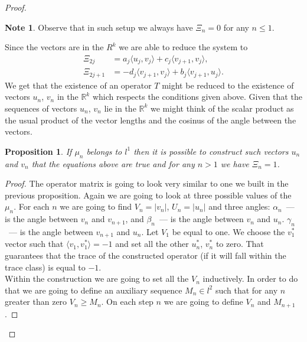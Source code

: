 \documentclass[12pt]{article}
\newcommand\inner[2]{\langle #1, #2 \rangle}
\renewcommand{\leq}{\leqslant}
\renewcommand{\geq}{\geqslant}
\newtheorem{prop}{Proposition}
\theoremstyle{definition}
\newtheorem*{note}{Note}
\numberwithin{remark}{section}
\numberwithin{theorem}{section}
\numberwithin{prop}{section}
\numberwithin{equation}{section}
\numberwithin{lemma}{section}
\numberwithin{prop_under_lemma}{lemma}
\begin{document}
\begin{proof}
\begin{note}
        Observe that in such setup we always have $\Xi_n = 0$ for any $n \leq 1$.
        \end{note}
        Since the vectors are in the $R^k$ we are able to reduce the system to
        \begin{align*}
            \Xi_{2j} &= a_{j} \inner{u_{j}}{v_{j}}  + c_{j} \inner{v_{j+1}}{v_{j}},\\
            \Xi_{2j + 1} &= -d_{j} \inner{v_{j+1}}{v_{j}} + b_{j} \inner{v_{j+1}}{u_{j}}.
        \end{align*}
        We get that the existence of an operator $T$
        might be reduced to the existence of vectors $u_n$, $v_n$ in the $\mathbb{R}^k$ which
        respects the conditions given above.
        Given that the sequences of vectors $u_n$, $v_n$ lie in the $\mathbb{R}^k$ we might think of the scalar product as
        the usual product of the vector lengths and the cosinus of the angle between the vectors.
        \begin{prop}
            \label{k-dim-statement}
            If $\mu_n$ belongs to $l^1$ then it is possible to construct such vectors $u_n$ and $v_n$ that the equations above are true and for any $n > 1$ we have $\Xi_n = 1$.
        \end{prop}
        \begin{proof}
            The operator matrix is going to look very similar to one we built in the previous proposition.
            Again we are going to look at three possible values of the $\mu_n$.
            For each $n$ we are going to find $V_n = |v_n|$, $U_n = |u_n|$ and three angles:
            $\alpha_n$~--- is the angle between $v_n$ and $v_{n + 1}$, and
            $\beta_n$~--- is the angle between $v_n$ and $u_n$.
            $\gamma_n$~--- is the angle between $v_{n + 1}$ and $u_n$.
            Let $V_1$ be equal to one.
            We choose the $v^*_1$ vector such that $\inner{v_1}{v^*_1} = -1$ and set all
            the other $u^*_n$, $v^*_n$ to zero. That guarantees that the trace of the constructed operator (if it
            will fall within the trace class) is equal to $-1$.\\
            Within the construction we are going to set all the $V_n$ inductively. In order to do
            that we are going to define an auxiliary sequence $M_n \in l^2$ such that for any $n$ greater than zero
            $V_n \geq M_n$. On each step $n$ we are going to define $V_n$ and $M_{n+1}$.
            

\end{proof}
\end{proof}
\end{document}
